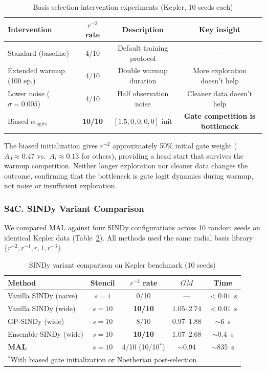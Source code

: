 \documentclass[9pt,twocolumn,twoside]{pnas-new}
\begin{document}
\begin{table}[!ht]
\centering
\caption{Basis selection intervention experiments (Kepler, 10 seeds each)}
\label{tab:interventions-si}
\footnotesize
\begin{tabular}{lccc}
\hline
Intervention & $r^{-2}$ rate & Description & Key insight \\
\hline
Standard (baseline) & 4/10 & Default training protocol & --- \\
Extended warmup (100 ep.) & 4/10 & Double warmup duration & More exploration doesn't help \\
Lower noise ($\sigma = 0.005$) & 4/10 & Half observation noise & Cleaner data doesn't help \\
Biased $\alpha_{\text{logits}}$ & \textbf{10/10} & $[1.5, 0, 0, 0, 0]$ init & \textbf{Gate competition is bottleneck} \\
\hline
\end{tabular}
\end{table}

The biased initialization gives $r^{-2}$ approximately 50\% initial gate weight ($A_0 \approx 0.47$ vs.\ $A_i \approx 0.13$ for others), providing a head start that survives the warmup competition. Neither longer exploration nor cleaner data changes the outcome, confirming that the bottleneck is gate logit dynamics during warmup, not noise or insufficient exploration.

\subsubsection*{S4C. SINDy Variant Comparison}
We compared MAL against four SINDy configurations across 10 random seeds on identical Kepler data (Table~\ref{tab:sindy-comparison-si}). All methods used the same radial basis library $\{r^{-2}, r^{-1}, r, 1, r^{-3}\}$.

\begin{table}[!ht]
\centering
\caption{SINDy variant comparison on Kepler benchmark (10 seeds)}
\label{tab:sindy-comparison-si}
\footnotesize
\begin{tabular}{lcccc}
\hline
Method & Stencil & $r^{-2}$ rate & $\overline{GM}$ & Time \\
\hline
Vanilla SINDy (naive) & $s=1$ & 0/10 & --- & $<0.01$~s \\
Vanilla SINDy (wide) & $s=10$ & \textbf{10/10} & $1.05 \text{--} 2.74$ & $<0.01$~s \\
GP-SINDy (wide) & $s=10$ & 8/10 & $0.97 \text{--} 1.88$ & $\sim$6~s \\
Ensemble-SINDy (wide) & $s=10$ & \textbf{10/10} & $1.07 \text{--} 2.68$ & $\sim$0.4~s \\
\textbf{MAL} & $s=10$ & 4/10 (10/10$^*$) & $\sim$0.94 & $\sim$835~s \\
\hline
\multicolumn{5}{l}{\footnotesize $^*$With biased gate initialization or Noetherian post-selection.} \\
\end{tabular}
\end{table}
\end{document}
